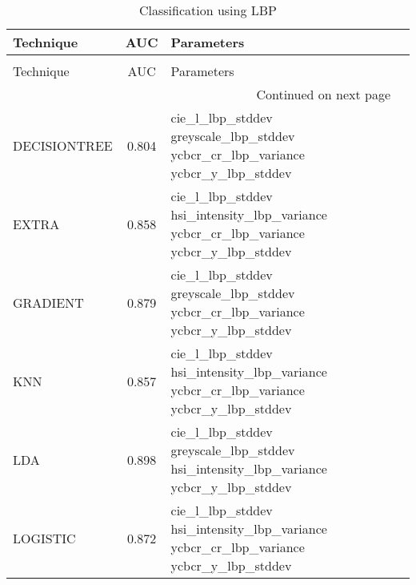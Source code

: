 \begin{longtable}{lcll}
\caption[Classification using LBP]{Classification using LBP}
\label{table:texture-lbp}\\
\toprule
   Technique &   AUC &                                                                               Parameters \\
\midrule
\endfirsthead
\caption[]{Classification using LBP} \\
\toprule
   Technique &   AUC &                                                                               Parameters \\
\midrule
\endhead
\midrule
\multicolumn{3}{r}{{Continued on next page}} \\
\midrule
\endfoot

\bottomrule
\endlastfoot
DECISIONTREE & 0.804 & \begin{minipage}[t]{0.5\textwidth}          cie\_l\_lbp\_stddev greyscale\_lbp\_stddev ycbcr\_cr\_lbp\_variance ycbcr\_y\_lbp\_stddev  \end{minipage}\\
\midrule
       EXTRA & 0.858 & \begin{minipage}[t]{0.5\textwidth}    cie\_l\_lbp\_stddev hsi\_intensity\_lbp\_variance ycbcr\_cr\_lbp\_variance ycbcr\_y\_lbp\_stddev  \end{minipage}\\
\midrule
    GRADIENT & 0.879 & \begin{minipage}[t]{0.5\textwidth}          cie\_l\_lbp\_stddev greyscale\_lbp\_stddev ycbcr\_cr\_lbp\_variance ycbcr\_y\_lbp\_stddev  \end{minipage}\\
\midrule
         KNN & 0.857 &\begin{minipage}[t]{0.5\textwidth}     cie\_l\_lbp\_stddev hsi\_intensity\_lbp\_variance ycbcr\_cr\_lbp\_variance ycbcr\_y\_lbp\_stddev  \end{minipage}\\
\midrule
         LDA & 0.898 & \begin{minipage}[t]{0.5\textwidth}     cie\_l\_lbp\_stddev greyscale\_lbp\_stddev hsi\_intensity\_lbp\_variance ycbcr\_y\_lbp\_stddev  \end{minipage}\\
\midrule
    LOGISTIC & 0.872 & \begin{minipage}[t]{0.5\textwidth}    cie\_l\_lbp\_stddev hsi\_intensity\_lbp\_variance ycbcr\_cr\_lbp\_variance ycbcr\_y\_lbp\_stddev  \end{minipage}\\

\end{longtable}
